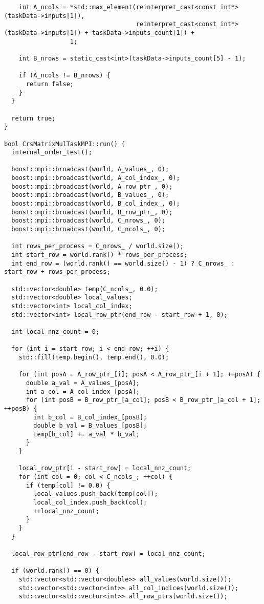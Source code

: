 \documentclass[12pt]{article}
\begin{document}
\begin{lstlisting}
    int A_ncols = *std::max_element(reinterpret_cast<const int*>(taskData->inputs[1]),
                                    reinterpret_cast<const int*>(taskData->inputs[1]) + taskData->inputs_count[1]) +
                  1;

    int B_nrows = static_cast<int>(taskData->inputs_count[5] - 1);

    if (A_ncols != B_nrows) {
      return false;
    }
  }

  return true;
}

bool CrsMatrixMulTaskMPI::run() {
  internal_order_test();

  boost::mpi::broadcast(world, A_values_, 0);
  boost::mpi::broadcast(world, A_col_index_, 0);
  boost::mpi::broadcast(world, A_row_ptr_, 0);
  boost::mpi::broadcast(world, B_values_, 0);
  boost::mpi::broadcast(world, B_col_index_, 0);
  boost::mpi::broadcast(world, B_row_ptr_, 0);
  boost::mpi::broadcast(world, C_nrows_, 0);
  boost::mpi::broadcast(world, C_ncols_, 0);

  int rows_per_process = C_nrows_ / world.size();
  int start_row = world.rank() * rows_per_process;
  int end_row = (world.rank() == world.size() - 1) ? C_nrows_ : start_row + rows_per_process;

  std::vector<double> temp(C_ncols_, 0.0);
  std::vector<double> local_values;
  std::vector<int> local_col_index;
  std::vector<int> local_row_ptr(end_row - start_row + 1, 0);

  int local_nnz_count = 0;

  for (int i = start_row; i < end_row; ++i) {
    std::fill(temp.begin(), temp.end(), 0.0);

    for (int posA = A_row_ptr_[i]; posA < A_row_ptr_[i + 1]; ++posA) {
      double a_val = A_values_[posA];
      int a_col = A_col_index_[posA];
      for (int posB = B_row_ptr_[a_col]; posB < B_row_ptr_[a_col + 1]; ++posB) {
        int b_col = B_col_index_[posB];
        double b_val = B_values_[posB];
        temp[b_col] += a_val * b_val;
      }
    }

    local_row_ptr[i - start_row] = local_nnz_count;
    for (int col = 0; col < C_ncols_; ++col) {
      if (temp[col] != 0.0) {
        local_values.push_back(temp[col]);
        local_col_index.push_back(col);
        ++local_nnz_count;
      }
    }
  }

  local_row_ptr[end_row - start_row] = local_nnz_count;

  if (world.rank() == 0) {
    std::vector<std::vector<double>> all_values(world.size());
    std::vector<std::vector<int>> all_col_indices(world.size());
    std::vector<std::vector<int>> all_row_ptrs(world.size());


\end{lstlisting}
\end{document}
